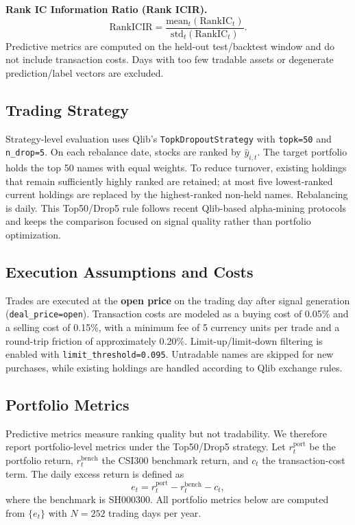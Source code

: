 \textbf{Rank IC Information Ratio (Rank ICIR).}
\begin{equation}
\mathrm{RankICIR}=\frac{\mathrm{mean}_{t}(\mathrm{RankIC}_t)}{\mathrm{std}_{t}(\mathrm{RankIC}_t)}.
\end{equation}
Predictive metrics are computed on the held-out test/backtest window and do not include transaction costs. Days with too few tradable assets or degenerate prediction/label vectors are excluded.

\subsection{Trading Strategy}

Strategy-level evaluation uses Qlib's \texttt{TopkDropoutStrategy} with \texttt{topk=50} and \texttt{n\_drop=5}. On each rebalance date, stocks are ranked by \(\hat y_{i,t}\). The target portfolio holds the top 50 names with equal weights. To reduce turnover, existing holdings that remain sufficiently highly ranked are retained; at most five lowest-ranked current holdings are replaced by the highest-ranked non-held names. Rebalancing is daily. This Top50/Drop5 rule follows recent Qlib-based alpha-mining protocols and keeps the comparison focused on signal quality rather than portfolio optimization.

\subsection{Execution Assumptions and Costs}

Trades are executed at the \textbf{open price} on the trading day after signal generation (\texttt{deal\_price=open}). Transaction costs are modeled as a buying cost of 0.05\% and a selling cost of 0.15\%, with a minimum fee of 5 currency units per trade and a round-trip friction of approximately 0.20\%. Limit-up/limit-down filtering is enabled with \texttt{limit\_threshold=0.095}. Untradable names are skipped for new purchases, while existing holdings are handled according to Qlib exchange rules.

\subsection{Portfolio Metrics}

Predictive metrics measure ranking quality but not tradability. We therefore report portfolio-level metrics under the Top50/Drop5 strategy. Let \(r^{\mathrm{port}}_t\) be the portfolio return, \(r^{\mathrm{bench}}_t\) the CSI300 benchmark return, and \(c_t\) the transaction-cost term. The daily excess return is defined as
\begin{equation}
e_t = r^{\mathrm{port}}_t - r^{\mathrm{bench}}_t - c_t,
\end{equation}
where the benchmark is SH000300. All portfolio metrics below are computed from \(\{e_t\}\) with \(N=252\) trading days per year.

